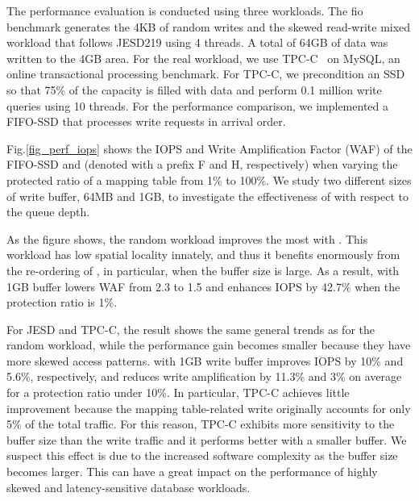 The performance evaluation is conducted using three workloads.
The fio benchmark generates the 4KB of random writes and the
skewed read-write mixed workload that follows JESD219 using 4 threads. A
total of 64GB of data was written to the 4GB area. For the real workload, we use 
TPC-C~\cite{council1990tpc} on MySQL, an online transactional processing benchmark.
For TPC-C, we precondition an SSD so that 75\% of the capacity is filled with data
and perform 0.1 million write queries using 10 threads.
For the performance comparison, we implemented a FIFO-SSD that processes 
write requests in arrival order.  

Fig.\ref{fig_perf_iops} shows the IOPS and Write Amplification Factor (WAF) of
the FIFO-SSD and \ours{} (denoted with a prefix F and H, respectively) when varying
the protected ratio of a mapping table from 1\% to 100\%.  We study two
different sizes of write buffer, 64MB and 1GB, to investigate the effectiveness
of \ours{} with respect to the queue depth. 

As the figure shows, the random workload improves the most with \ours{}.  This
workload has low spatial locality innately, and thus it benefits enormously
from the re-ordering of \ours{}, in particular, 
when the buffer size is large. As a result, \ours{} with 1GB buffer
lowers WAF from 2.3 to 1.5 and enhances IOPS by 42.7\% when the protection
ratio is 1\%. 

For JESD and TPC-C, the result shows the same general trends as for the random
workload, while the performance gain becomes smaller because they have more skewed
access patterns. \ours{} with 1GB write buffer improves IOPS by 10\% and 
5.6\%, respectively, and reduces write amplification by 11.3\% and 3\% on average for a 
protection ratio under 10\%. 
In particular, TPC-C achieves little improvement because 
the mapping table-related write originally accounts for only 5\% of the total traffic. 
For this reason, TPC-C exhibits more sensitivity to the buffer size than the write
traffic and it performs better with a smaller buffer.  We suspect
this effect is due to the increased software complexity as the buffer size
becomes larger. This can have a great impact on the performance of 
highly skewed and latency-sensitive database workloads. 

